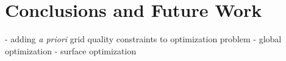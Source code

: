 \section{Conclusions and Future Work}
- adding {\it{a priori}} grid quality constraints to optimization problem
- global optimization
- surface optimization
